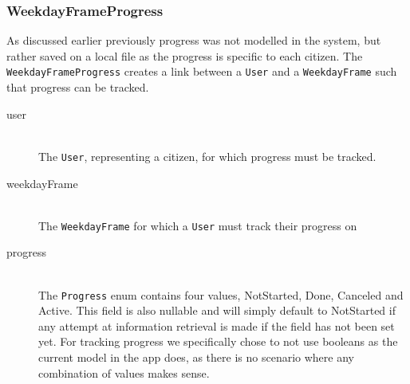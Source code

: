 \subsubsection{WeekdayFrameProgress}
As discussed earlier previously progress was not modelled in the system, but rather saved on a local file as the progress is specific to each citizen.
The \texttt{WeekdayFrameProgress} creates a link between a \texttt{User} and a \texttt{WeekdayFrame} such that progress can be tracked.

\begin{table}[ht]
    \caption{Table that represents the \texttt{WeekdayFrameProgress} class}
    \label{tbl:WeekdayFrameProgress}
\end{table}

\begin{description}
    \item [user] \hfill \\
    The \texttt{User}, representing a citizen, for which progress must be tracked.
    \item [weekdayFrame] \hfill \\
    The \texttt{WeekdayFrame} for which a \texttt{User} must track their progress on
    \item [progress] \hfill \\
    The \texttt{Progress} enum contains four values, NotStarted, Done, Canceled and Active.
    This field is also nullable and will simply default to NotStarted if any attempt at information retrieval is made if the field has not been set yet.
    For tracking progress we specifically chose to not use booleans as the current model in the app does, as there is no scenario where any combination of values makes sense.
\end{description}

